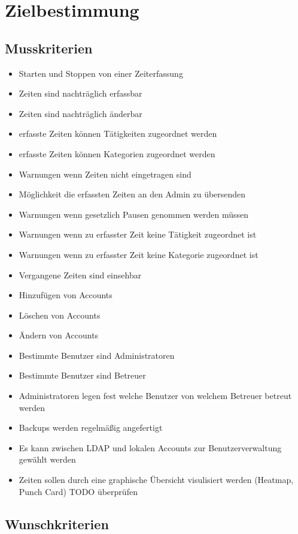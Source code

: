 \section{Zielbestimmung}

\subsection{Musskriterien}

\begin{itemize}
	\item Starten und Stoppen von einer Zeiterfassung
	\item Zeiten sind nachträglich erfassbar
	\item Zeiten sind nachträglich änderbar
	\item erfasste Zeiten können Tätigkeiten zugeordnet werden
	\item erfasste Zeiten können Kategorien zugeordnet werden
	\item Warnungen wenn Zeiten nicht eingetragen sind
	\item Möglichkeit die erfassten Zeiten an den Admin zu übersenden
	\item Warnungen wenn gesetzlich Pausen genommen werden müssen
	\item Warnungen wenn zu erfasster Zeit keine Tätigkeit zugeordnet ist
	\item Warnungen wenn zu erfasster Zeit keine Kategorie zugeordnet ist
	\item Vergangene Zeiten sind einsehbar
	\item Hinzufügen von Accounts
	\item Löschen von Accounts
	\item Ändern von Accounts
	\item Bestimmte Benutzer sind Administratoren
	\item Bestimmte Benutzer sind Betreuer
	\item Administratoren legen fest welche Benutzer von welchem Betreuer betreut werden
	\item Backups werden regelmäßig angefertigt
	\item Es kann zwischen LDAP und lokalen Accounts zur Benutzerverwaltung gewählt werden
	\item Zeiten sollen durch eine graphische Übersicht visulisiert werden (Heatmap, Punch Card) TODO überprüfen
\end{itemize}


\subsection{Wunschkriterien}

